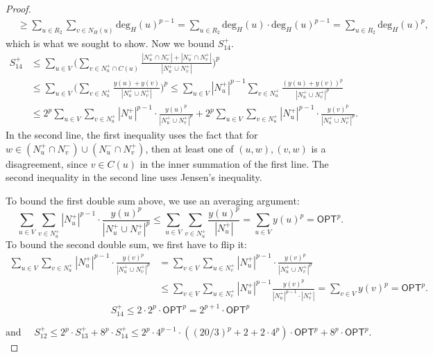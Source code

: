 \documentclass[11pt]{article}
\begin{document}
\begin{proof}
\begin{align*}
    &\geq \sum_{u \in R_2} \sum_{v \in N_H(u)} \text{deg}_H(u)^{p-1} 
    = \sum_{u \in R_2} \text{deg}_H(u) \cdot \text{deg}_H(u)^{p-1} 
    = \sum_{u \in R_2} \text{deg}_H(u)^{p},
\end{align*}
 which is what we sought to show.
Now we bound $S_{14}^+$. 
\begin{align*}
    S_{14}^+ &\leq \sum_{u \in V} \Bigg(\sum_{v \in N_u^+ \cap C(u)} \frac{|N_u^+ \cap N_v^-| + |N_u^- \cap N_v^+|}{|N_u^+ \cup N_v^+|} \Bigg)^p \\
    &\leq \sum_{u \in V} \Bigg(\sum_{v \in N_u^+} \frac{y(u) + y(v)}{|N_u^+ \cup N_v^+|} \Bigg)^p 
    \leq \sum_{u \in V} |N_u^+|^{p-1} \sum_{v \in N_u^+} \frac{(y(u) + y(v))^p}{|N_u^+ \cup N_v^+|^p} \\
    &\leq 2^p\sum_{u \in V}\sum_{v \in N_u^+} |N_u^+|^{p-1} \cdot \frac{y(u)^p}{|N_u^+ \cup N_v^+|^p} + 2^p\sum_{u \in V}\sum_{v \in N_u^+} |N_u^+|^{p-1} \cdot \frac{y(v)^p}{|N_u^+ \cup N_v^+|^p}. 
\end{align*}
In the second line, the first inequality uses the fact that for $w \in (N_u^+ \cap N_v^-) \cup (N_u^- \cap N_v^+)$, then at least one of $(u,w), (v,w)$ is a disagreement, since $v \in C(u)$ in the inner summation of the first line. The second inequality in the second line uses Jensen's inequality. 

To bound the first double sum above, we use an averaging argument:
$$\sum_{u \in V}\sum_{v \in N_u^+} |N_u^+|^{p-1} \cdot \frac{y(u)^p}{|N_u^+ \cup N_v^+|^p} \leq \sum_{u \in V} \sum_{v \in N_u^+} \frac{y(u)^p}{|N_u^+|} = \sum_{u \in V} y(u)^p = \textsf{OPT}^p.$$
To bound the second double sum, we first have to flip it:
\begin{align*}
\sum_{u \in V}\sum_{v \in N_u^+} |N_u^+|^{p-1} \cdot \frac{y(v)^p}{|N_u^+ \cup N_v^+|^p} &= \sum_{v \in V} \sum_{u \in N_v^+} |N_u^+|^{p-1} \cdot \frac{y(v)^p}{|N_u^+ \cup N_v^+|^p} \\
&\leq \sum_{v \in V} \sum_{u \in N_v^+} |N_u^+|^{p-1} \frac{y(v)^p}{|N_u^+|^{p-1} \cdot |N_v^+|} 
= \sum_{v \in V} y(v)^p = \textsf{OPT}^p.
\end{align*}
$$\boxed{S_{14}^+ \leq 2 \cdot 2^p \cdot \textsf{OPT}^p = 2^{p+1} \cdot \textsf{OPT}^p}$$ 

$$\text{and } \quad\boxed{S_{12}^+ \leq 2^p \cdot S_{13}^+ + 8^p \cdot S_{14}^+ \leq 2^p \cdot 4^{p-1} \cdot \left((20/3)^p + 2 + 2 \cdot 4^p \right) \cdot \textsf{OPT}^p + 8^p \cdot \textsf{OPT}^p.}$$





\end{proof}
\end{document}
